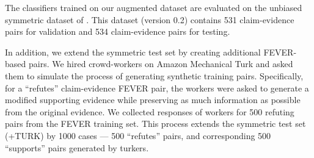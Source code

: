 \documentclass[letterpaper]{article} %
\begin{document}
The classifiers trained on our augmented dataset are evaluated on the unbiased symmetric dataset of \cite{schuster2019towards}. This dataset (version 0.2) contains 531 claim-evidence pairs for validation and 534 claim-evidence pairs for testing.


In addition, we extend the symmetric test set by creating additional FEVER-based pairs.
We hired crowd-workers on Amazon Mechanical Turk and asked them to simulate the process of generating synthetic training pairs. Specifically, for a ``refutes'' claim-evidence FEVER pair, the workers were asked to generate a modified supporting evidence while preserving as much information as possible from the original evidence. We collected responses of workers for 500 refuting pairs from the FEVER training set.
This process extends the symmetric test set (\textsc{+TURK}) by 1000 cases --- 500 ``refutes'' pairs, and corresponding 500 ``supports'' pairs generated by turkers.
\end{document}
